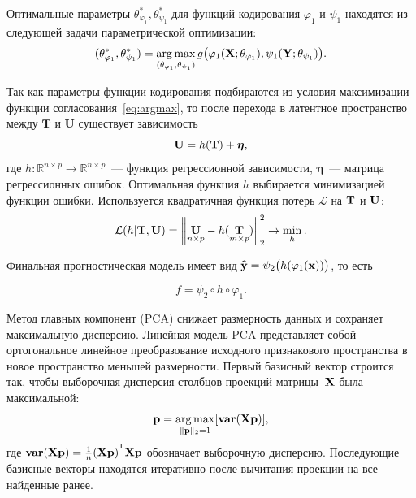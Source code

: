 Оптимальные параметры $\theta_{\varphi_1}^{*}, \theta_{\psi_1}^{*}$ для функций кодирования $\varphi_1$  и $\psi_1$ находятся из следующей задачи параметрической оптимизации:
\begin{equation}
	(\theta_{\varphi_1}^{*}, \theta_{\psi_1}^{*}) = \mathop{\arg \max}\limits_{(\theta_{\varphi_1}, \theta_{\psi_1})} g\bigl( \varphi_1(\mathbf{X}; \theta_{\varphi_1}), \psi_1(\mathbf{Y}; \theta_{\psi_1})\bigr).
\label{eq:argmax}
\end{equation}

Так как параметры функции кодирования подбираются из условия максимизации функции согласования~\eqref{eq:argmax}, то после перехода в латентное пространство между $\mathbf{T}$ и $\mathbf{U}$ существует зависимость
\begin{equation}
	\mathbf{U} = h(\mathbf{T}) +  \boldsymbol{\eta},
	\label{eq:reg2}
\end{equation}
где $h: \mathbb{R}^{n \times p} \to \mathbb{R}^{n \times p}$~--- функция регрессионной зависимости,  $\boldsymbol{\eta}$~--- матрица регрессионных ошибок.
Оптимальная функция $h$ выбирается минимизацией функции ошибки. Используется квадратичная функция потерь $\mathcal{L}$ на $\mathbf{T}$ и $\mathbf{U}$:
\begin{equation}
	\mathcal{L}(h | {\mathbf{T}}, {\mathbf{U}}) = {\left\| \underset{n \times p}{\mathbf{U}}  - h(\underset{m \times p}{\mathbf{T}}) \right\| }_2^2 \rightarrow\min_{h}.
	\label{eq:loss_function}
\end{equation}

Финальная прогностическая модель имеет вид
$\widehat{\mathbf{y}} = \psi_2\bigl(h(\varphi_1(\mathbf{x}))\bigr)$, то есть

\begin{equation}
	f = \psi_2 \circ h \circ \varphi_1.
	\label{eq:f}
\end{equation}

Метод главных компонент (PCA) снижает размерность данных и сохраняет максимальную дисперсию. Линейная модель PCA представляет собой ортогональное линейное преобразование исходного признакового пространства в новое пространство меньшей размерности. Первый базисный вектор строится так, чтобы выборочная дисперсия столбцов проекций матрицы~$\mathbf{X}$ была максимальной:
\begin{equation}
	\mathbf{p} = \mathop{\arg \max}\limits_{\|\mathbf{p}\|_{2} = 1} [\textbf{var}(\mathbf{X} \textbf{p})],
	\label{eq:PCA}
\end{equation}
где $\textbf{var}(\bX \textbf{p}) = \frac{1}{n} (\bX \textbf{p})^{\T}\bX \textbf{p}$ обозначает выборочную дисперсию. Последующие базисные векторы находятся итеративно после вычитания проекции на все найденные ранее.

